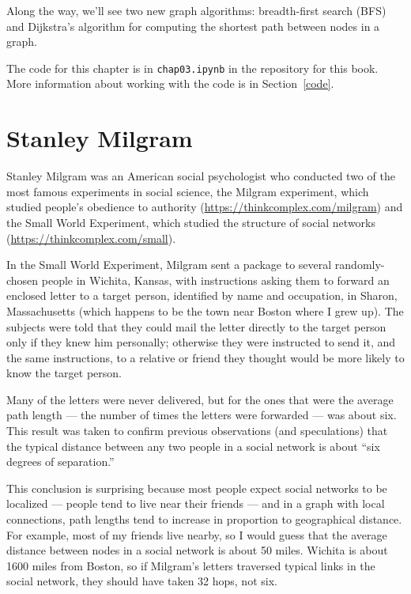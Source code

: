 \documentclass[12pt]{book}
\theoremstyle{exercise}
\begin{document}
Along the way, we'll see two new graph algorithms: breadth-first
search (BFS) and Dijkstra's algorithm for computing the shortest
path between nodes in a graph.

The code for this chapter is in {\tt chap03.ipynb} in the repository
for this book.  More information about working with the code is
in Section~\ref{code}.

\section{Stanley Milgram}

Stanley Milgram was an American social psychologist who conducted
two of the most famous experiments in social science, the
Milgram experiment, which studied people's obedience to authority
(\url{https://thinkcomplex.com/milgram})
and the Small World Experiment, which studied
the structure of social networks
(\url{https://thinkcomplex.com/small}).


In the Small World Experiment, Milgram sent a package to several
randomly-chosen people in Wichita, Kansas, with instructions asking
them to forward an enclosed letter to a target person, identified by
name and occupation, in Sharon, Massachusetts (which happens to be the town near
Boston where I grew up).  The subjects were told that they could mail
the letter directly to the target person only if they knew him
personally; otherwise they were instructed to send it, and the same
instructions, to a relative or friend they thought would be more
likely to know the target person.


Many of the letters were never delivered, but for the ones that
were the average path length --- the number of
times the letters were forwarded --- was about six.  This result
was taken to confirm previous observations (and speculations) that
the typical distance between any two people in a social network
is about ``six degrees of separation.''


This conclusion is surprising because most people expect social
networks to be localized --- people tend to live near their
friends --- and in a graph with local connections, path lengths tend to
increase in proportion to geographical distance.  For example, most of
my friends live nearby, so I would guess that the average distance
between nodes in a social network is about 50 miles.  Wichita is about
1600 miles from Boston, so if Milgram's letters traversed typical
links in the social network, they should have taken 32 hops, not six.
\end{document}
